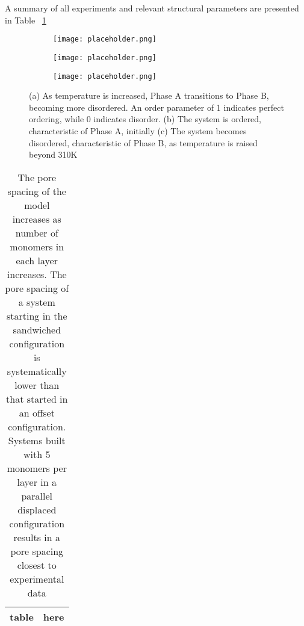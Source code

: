 	A summary of all experiments and relevant structural parameters are presented in Table ~\ref{table:p2p}

\begin{figure}
\centering
\begin{subfigure}{0.3\textwidth}
	\centering
	\texttt{[image: placeholder.png]}
	\caption{}\label{fig:orderparameter}
\end{subfigure}
\begin{subfigure}{0.3\textwidth}
	\centering
	\texttt{[image: placeholder.png]}
	\caption{}\label{fig:order}
\end{subfigure}
\begin{subfigure}{0.3\textwidth}
	\centering
	\texttt{[image: placeholder.png]}
	\caption{}\label{fig:disorder}
\end{subfigure}
\caption{(a) As temperature is increased, Phase A transitions to Phase B, becoming more disordered. An order parameter of 1 indicates perfect ordering, while 0 indicates disorder. (b) The system is ordered, characteristic of Phase A, initially (c) The system becomes disordered, characteristic of Phase B, as temperature is raised beyond 310K}\label{fig:transition}
\end{figure}	

\begin{table}
\centering
\begin{tabular}{|c|c|}
\hline
table & here \\
\hline
\end{tabular}
\caption{The pore spacing of the model increases as number of monomers in each layer increases. The pore spacing of a system starting in the sandwiched configuration is systematically lower than that started in an offset configuration. Systems built with 5 monomers per layer in a parallel displaced configuration results in a pore spacing closest to experimental data}\label{table:p2p} 
\end{table}
	
